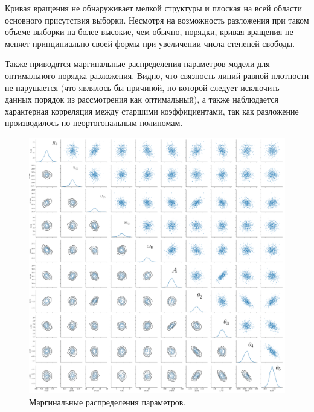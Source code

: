 \documentclass{matmex-diploma-custom}
\begin{document}
\par Кривая вращения не обнаруживает мелкой структуры и плоская на всей области основного присутствия выборки. Несмотря на возможность разложения при таком объеме выборки на более высокие, чем обычно, порядки, кривая вращения не меняет принципиально своей формы при увеличении числа степеней свободы.
%

\pagebreak
Также приводятся маргинальные распределения параметров модели для оптимального порядка разложения. Видно, что связность линий равной плотности не нарушается (что являлось бы причиной, по которой следует исключить данных порядок из рассмотрения как оптимальный), а также наблюдается характерная корреляция между старшими коэффициентами, так как разложение производилось по неортогональным полиномам.
\begin{figure}[h!!]
\begin{center}
\begin{minipage}[h!!]{0.95\linewidth}
        \includegraphics[width=1.0\textwidth]{../imgs/pairplot.png}
\end{minipage}
\caption{Маргинальные распределения параметров.}
\end{center}
\end{figure}
\end{document}
